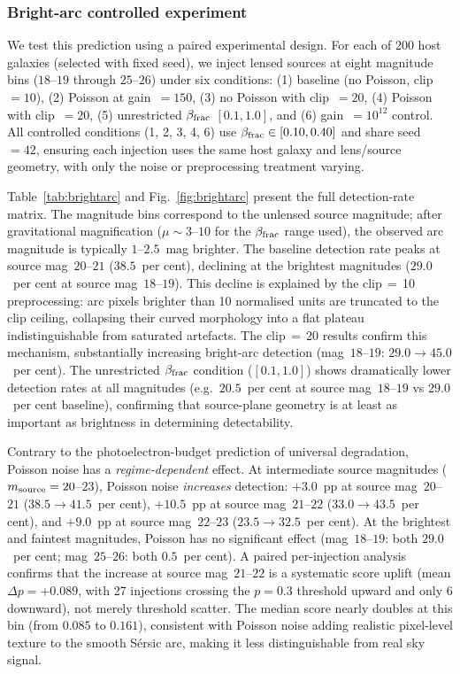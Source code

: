 \documentclass[fleqn,usenatbib]{rasti}
\begin{document}
\subsubsection{Bright-arc controlled experiment}
\label{sec:brightarc}

We test this prediction using a paired experimental design.  For each of 200 host galaxies (selected with fixed seed), we inject lensed sources at eight magnitude bins ($18$--$19$ through $25$--$26$) under six conditions: (1) baseline (no Poisson, clip~$= 10$), (2) Poisson at gain~$= 150$, (3) no Poisson with clip~$= 20$, (4) Poisson with clip~$= 20$, (5) unrestricted $\beta_{\rm frac}$ $[0.1, 1.0]$, and (6) gain~$= 10^{12}$ control.  All controlled conditions (1, 2, 3, 4, 6) use $\beta_{\rm frac} \in [0.10, 0.40]$ and share seed~$= 42$, ensuring each injection uses the same host galaxy and lens/source geometry, with only the noise or preprocessing treatment varying.

Table~\ref{tab:brightarc} and Fig.~\ref{fig:brightarc} present the full detection-rate matrix.  The magnitude bins correspond to the unlensed source magnitude; after gravitational magnification ($\mu \sim 3$--$10$ for the $\beta_{\rm frac}$ range used), the observed arc magnitude is typically $1$--$2.5$~mag brighter.  The baseline detection rate peaks at source mag~$20$--$21$ ($38.5$~per cent), declining at the brightest magnitudes ($29.0$~per cent at source mag~$18$--$19$).  This decline is explained by the clip$\,=\,$10 preprocessing: arc pixels brighter than 10 normalised units are truncated to the clip ceiling, collapsing their curved morphology into a flat plateau indistinguishable from saturated artefacts.  The clip$\,=\,$20 results confirm this mechanism, substantially increasing bright-arc detection (mag~$18$--$19$: $29.0 \to 45.0$~per cent).  The unrestricted $\beta_{\rm frac}$ condition ($[0.1, 1.0]$) shows dramatically lower detection rates at all magnitudes (e.g.\ $20.5$~per cent at source mag~$18$--$19$ vs $29.0$~per cent baseline), confirming that source-plane geometry is at least as important as brightness in determining detectability.

Contrary to the photoelectron-budget prediction of universal degradation, Poisson noise has a \emph{regime-dependent} effect.  At intermediate source magnitudes ($m_{\rm source} = 20$--$23$), Poisson noise \emph{increases} detection: $+3.0$~pp at source mag~$20$--$21$ ($38.5 \to 41.5$~per cent), $+10.5$~pp at source mag~$21$--$22$ ($33.0 \to 43.5$~per cent), and $+9.0$~pp at source mag~$22$--$23$ ($23.5 \to 32.5$~per cent).  At the brightest and faintest magnitudes, Poisson has no significant effect (mag~$18$--$19$: both $29.0$~per cent; mag~$25$--$26$: both $0.5$~per cent).  A paired per-injection analysis confirms that the increase at source mag~$21$--$22$ is a systematic score uplift (mean $\Delta p = +0.089$, with 27 injections crossing the $p = 0.3$ threshold upward and only 6 downward), not merely threshold scatter.  The median score nearly doubles at this bin (from $0.085$ to $0.161$), consistent with Poisson noise adding realistic pixel-level texture to the smooth S\'{e}rsic arc, making it less distinguishable from real sky signal.
\end{document}
